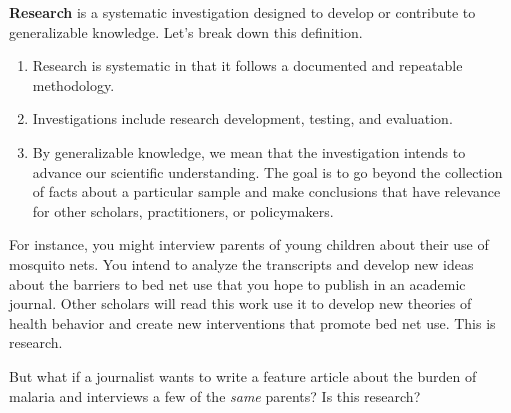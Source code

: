 \documentclass[
  letterpaper,
  DIV=11,
  numbers=noendperiod,
  oneside]{scrreprt}
\providecommand{\tightlist}{%
  \setlength{\itemsep}{0pt}\setlength{\parskip}{0pt}}\usepackage{longtable,booktabs,array}
\begin{document}

\textbf{Research} is a systematic investigation designed to develop or
contribute to generalizable knowledge. Let's break down this definition.

\begin{enumerate}
\def\labelenumi{\arabic{enumi}.}
\tightlist
\item
  Research is systematic in that it follows a documented and repeatable
  methodology.
\item
  Investigations include research development, testing, and evaluation.
\item
  By generalizable knowledge, we mean that the investigation intends to
  advance our scientific understanding. The goal is to go beyond the
  collection of facts about a particular sample and make conclusions
  that have relevance for other scholars, practitioners, or
  policymakers.
\end{enumerate}

For instance, you might interview parents of young children about their
use of mosquito nets. You intend to analyze the transcripts and develop
new ideas about the barriers to bed net use that you hope to publish in
an academic journal. Other scholars will read this work use it to
develop new theories of health behavior and create new interventions
that promote bed net use. This is research.

But what if a journalist wants to write a feature article about the
burden of malaria and interviews a few of the \emph{same} parents? Is
this research?

\end{document}
